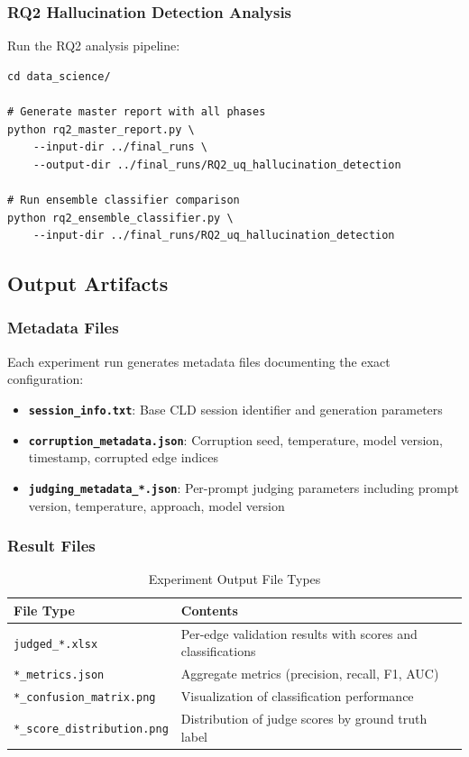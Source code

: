 \documentclass{article}
\begin{document}
\subsubsection{RQ2 Hallucination Detection Analysis}

Run the RQ2 analysis pipeline:

\begin{verbatim}
cd data_science/

# Generate master report with all phases
python rq2_master_report.py \
    --input-dir ../final_runs \
    --output-dir ../final_runs/RQ2_uq_hallucination_detection

# Run ensemble classifier comparison
python rq2_ensemble_classifier.py \
    --input-dir ../final_runs/RQ2_uq_hallucination_detection
\end{verbatim}

\subsection{Output Artifacts}
\label{sec:output_artifacts}

\subsubsection{Metadata Files}

Each experiment run generates metadata files documenting the exact configuration:

\begin{itemize}
    \item \textbf{\texttt{session\_info.txt}}: Base CLD session identifier and generation parameters
    \item \textbf{\texttt{corruption\_metadata.json}}: Corruption seed, temperature, model version, timestamp, corrupted edge indices
    \item \textbf{\texttt{judging\_metadata\_*.json}}: Per-prompt judging parameters including prompt version, temperature, approach, model version
\end{itemize}

\subsubsection{Result Files}

\begin{table}[H]
\centering
\caption{Experiment Output File Types}
\label{tab:output_files}
\begin{tabular}{ll}
\toprule
\textbf{File Type} & \textbf{Contents} \\
\midrule
\texttt{judged\_*.xlsx} & Per-edge validation results with scores and classifications \\
\texttt{*\_metrics.json} & Aggregate metrics (precision, recall, F1, AUC) \\
\texttt{*\_confusion\_matrix.png} & Visualization of classification performance \\
\texttt{*\_score\_distribution.png} & Distribution of judge scores by ground truth label \\
\bottomrule
\end{tabular}
\end{table}
\end{document}
